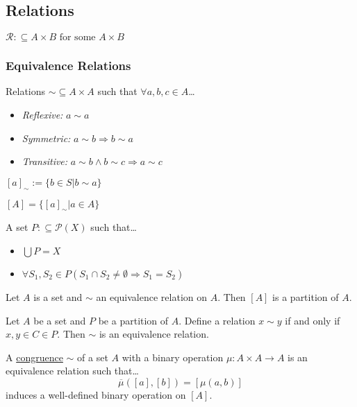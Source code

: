 \subsection{Relations}\label{relations}
$\mathcal{R} :\subseteq A \times B \textrm{ for some } A \times B$

\subsubsection{Equivalence Relations}\label{equivalencerelation}
Relations $\sim \subseteq A \times A$ such that $\forall a,b,c \in A$\dots
\begin{itemize}
  \item \emph{Reflexive:} $a \sim a$
  \item \emph{Symmetric:} $a \sim b \Rightarrow b \sim a$
  \item \emph{Transitive:} $a \sim b \land b \sim c \Rightarrow a \sim c$
\end{itemize}

$[a]_{\sim} := \{ b \in S | b \sim a \}$

$[A] = \{[a]_{\sim} | a \in A \}$

A set $P :\subseteq \mathcal{P}(X)$ such that\dots
\begin{itemize}
  \item $\bigcup P = X$
  \item $\forall S_1, S_2 \in P (S_1 \cap S_2 \neq \emptyset \Rightarrow S_1 = S_2)$
\end{itemize}

\begin{proposition}
Let $A$ is a set and $\sim$ an equivalence relation on $A$. Then $[A]$ is a partition of $A$.
\end{proposition}

\begin{proposition}
Let $A$ be a set and $P$ be a partition of $A$. Define a relation $x \sim y$ if and only if $x,y \in C \in P$. Then $\sim$ is an equivalence relation.
\end{proposition}

\label{congruencerelation}
A \hyperref[congruence]{congruence} $\sim$ of a set $A$ with a binary operation $\mu : A \times A \rightarrow A$ is an equivalence relation such that\dots
$$\overline{\mu}([a],[b]) = [\mu (a,b)]$$
induces a well-defined binary operation on $[A]$.

